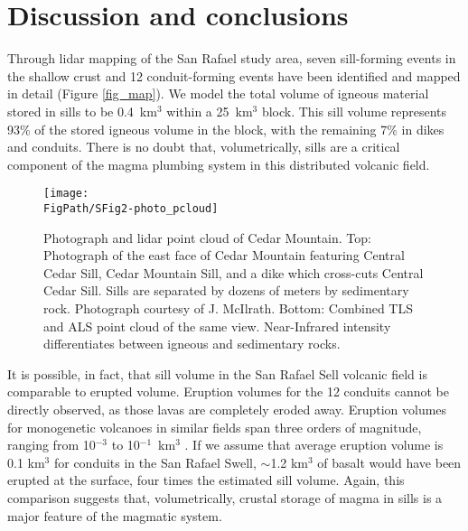 \section{Discussion and conclusions}

Through lidar mapping of the San Rafael study area, seven sill-forming events in the shallow crust and 12 conduit-forming events have been identified and mapped in detail (Figure \ref{fig_map}). We model the total volume of igneous material stored in sills to be 0.4~km$^3$ within a 25~km$^3$ block. This sill volume represents 93\% of the stored igneous volume in the block, with the remaining 7\% in dikes and conduits. There is no doubt that, volumetrically, sills are a critical component of the magma plumbing system in this distributed volcanic field.

\begin{figure}
\centering
\texttt{[image: \\FigPath/SFig2-photo\_pcloud]}
\caption[Photograph and lidar point cloud of Cedar Mountain]{Photograph and lidar point cloud of Cedar Mountain. Top: Photograph of the east face of Cedar Mountain featuring Central Cedar Sill, Cedar Mountain Sill, and a dike which cross-cuts Central Cedar Sill. Sills are separated by dozens of meters by sedimentary rock. Photograph courtesy of J. McIlrath. Bottom: Combined TLS and ALS point cloud of the same view. Near-Infrared intensity differentiates between igneous and sedimentary rocks.}
\label{fig_photo-pcloud}
\end{figure}

It is possible, in fact, that sill volume in the San Rafael Sell volcanic field is comparable to erupted volume. Eruption volumes for the 12 conduits cannot be directly observed, as those lavas are completely eroded away. Eruption volumes for monogenetic volcanoes in similar fields span three orders of magnitude, ranging from 10$^{-3}$ to 10$^{-1}$~km$^3$ \citep[e.g.]{crowe1983aspects, condit1989patterns, kiyosugi2012relationship}. If we assume that average eruption volume is 0.1 km$^3$ for conduits in the San Rafael Swell, $\sim$1.2 km$^3$ of basalt would have been erupted at the surface, four times the estimated sill volume. Again, this comparison suggests that, volumetrically, crustal storage of magma in sills is a major feature of the magmatic system.


